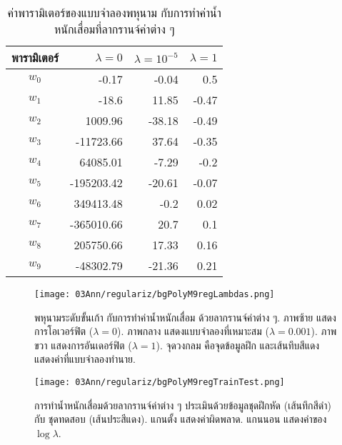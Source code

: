 \begin{table}[hbtp]
	\caption{ค่าพารามิเตอร์ของแบบจำลองพหุนาม กับการทำค่าน้ำหนักเสื่อมที่ลากรานจ์ค่าต่าง ๆ}
	\begin{center}
		\begin{tabular}{|c|r|r|r|}
			\hline 
			พารามิเตอร์ & $\lambda = 0$ & $\lambda = 10^{-5}$ & $\lambda = 1$ \\
			\hline
			$w_0$ & -0.17  & -0.04  & 0.5  \\
			$w_1$ & -18.6  & 11.85  & -0.47  \\
			$w_2$ & 1009.96  & -38.18  & -0.49  \\
			$w_3$ & -11723.66  & 37.64  & -0.35  \\ 
			$w_4$ & 64085.01  & -7.29  & -0.2  \\
			$w_5$ & -195203.42  & -20.61  & -0.07  \\
			$w_6$ & 349413.48  & -0.2  & 0.02  \\
			$w_7$ & -365010.66  & 20.7  & 0.1  \\
			$w_8$ & 205750.66  & 17.33  & 0.16  \\ 
			$w_9$ & -48302.79  & -21.36  & 0.21  \\ 
			\hline 
		\end{tabular} 
	\end{center}
	\label{tbl: bg polynomial coeff regularization}
\end{table}


%
\begin{figure}
	\begin{center}
		\texttt{[image: 03Ann/regulariz/bgPolyM9regLambdas.png]}
	\end{center}
	\caption[พหุนามระดับขั้นเก้า กับการทำค่าน้ำหนักเสื่อม]{พหุนามระดับขั้นเก้า กับการทำค่าน้ำหนักเสื่อม ด้วยลากรานจ์ค่าต่าง ๆ.
		ภาพซ้าย แสดงการโอเวอร์ฟิต ($\lambda = 0$).
		ภาพกลาง แสดงแบบจำลองที่เหมาะสม ($\lambda = 0.001$).
		ภาพขวา แสดงการอันเดอร์ฟิต ($\lambda = 1$).
	จุดวงกลม คือจุดข้อมูลฝึก และเส้นทึบสีแดง แสดงค่าที่แบบจำลองทำนาย.}
	\label{fig: bg poly M9 reg different lambdas}
\end{figure}
%

%
\begin{figure}
	\begin{center}
		\texttt{[image: 03Ann/regulariz/bgPolyM9regTrainTest.png]}
	\end{center}
	\caption[การทำน้ำหนักเสื่อมด้วยลากรานจ์ค่าต่าง ๆ]{การทำน้ำหนักเสื่อมด้วยลากรานจ์ค่าต่าง ๆ ประเมินด้วยข้อมูลชุดฝึกหัด (เส้นทึกสีดำ) กับ ชุดทดสอบ (เส้นประสีแดง). แกนตั้ง แสดงค่าผิดพลาด. แกนนอน แสดงค่าของ $\log \lambda$.}
	\label{fig: bg poly regularization evaluation}
\end{figure}
%

